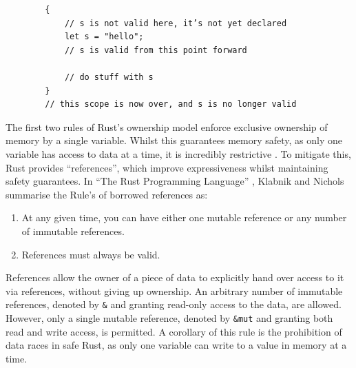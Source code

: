 \begin{listing}[H]
    \begin{verbatim}
        {
            // s is not valid here, it’s not yet declared
            let s = "hello";
            // s is valid from this point forward

            // do stuff with s
        }
        // this scope is now over, and s is no longer valid
    \end{verbatim}
    \caption{Rust program to demonstrate the scope of variables, derived from Listing 4-1 of Klabnik and Nichols' ``The Rust Programming Language'' \cite{RustProgrammingLanguage}.}
    \label{listing:rust-scope}
\end{listing}

The first two rules of Rust's ownership model enforce exclusive ownership of memory by a single variable. Whilst this guarantees memory safety, as only one variable has access to data at a time, it is incredibly restrictive \cite{sautterOBSERVINGPARALLELEXECUTION}. To mitigate this, Rust provides ``references'', which improve expressiveness whilst maintaining safety guarantees. In ``The Rust Programming Language'' \cite{RustProgrammingLanguage}, Klabnik and Nichols summarise the Rule's of borrowed references as:

\begin{quotebox}
    \begin{enumerate}
        \item At any given time, you can have either one mutable reference or any number of immutable references.
        \item References must always be valid.
    \end{enumerate}
\end{quotebox}

References allow the owner of a piece of data to explicitly hand over access to it via references, without giving up ownership. An arbitrary number of immutable references, denoted by \texttt{&} and granting read-only access to the data, are allowed. However, only a single mutable reference, denoted by \texttt{&mut} and granting both read and write access, is permitted. A corollary of this rule is the prohibition of data races in safe Rust, as only one variable can write to a value in memory at a time.


